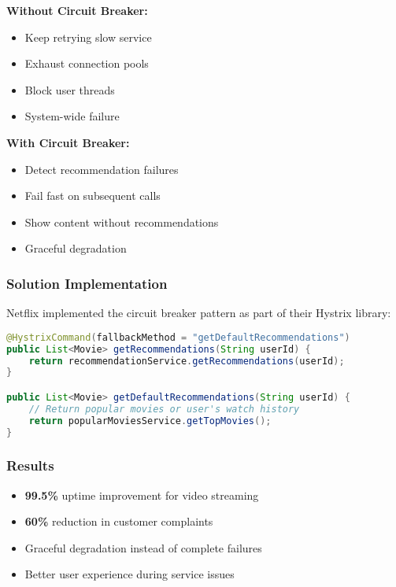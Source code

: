 \documentclass[12pt,a4paper]{article}
\begin{document}
\begin{multicols}{2}
\textbf{Without Circuit Breaker:}
\begin{itemize}
    \item Keep retrying slow service
    \item Exhaust connection pools
    \item Block user threads
    \item System-wide failure
\end{itemize}

\columnbreak

\textbf{With Circuit Breaker:}
\begin{itemize}
    \item Detect recommendation failures
    \item Fail fast on subsequent calls
    \item Show content without recommendations
    \item Graceful degradation
\end{itemize}
\end{multicols}

\subsubsection{Solution Implementation}

Netflix implemented the circuit breaker pattern as part of their Hystrix library:

\begin{lstlisting}[language=Java, caption=Netflix Hystrix Example]
@HystrixCommand(fallbackMethod = "getDefaultRecommendations")
public List<Movie> getRecommendations(String userId) {
    return recommendationService.getRecommendations(userId);
}

public List<Movie> getDefaultRecommendations(String userId) {
    // Return popular movies or user's watch history
    return popularMoviesService.getTopMovies();
}
\end{lstlisting}

\subsubsection{Results}
\begin{itemize}
    \item \textbf{99.5\%} uptime improvement for video streaming
    \item \textbf{60\%} reduction in customer complaints
    \item Graceful degradation instead of complete failures
    \item Better user experience during service issues
\end{itemize}
\end{document}
